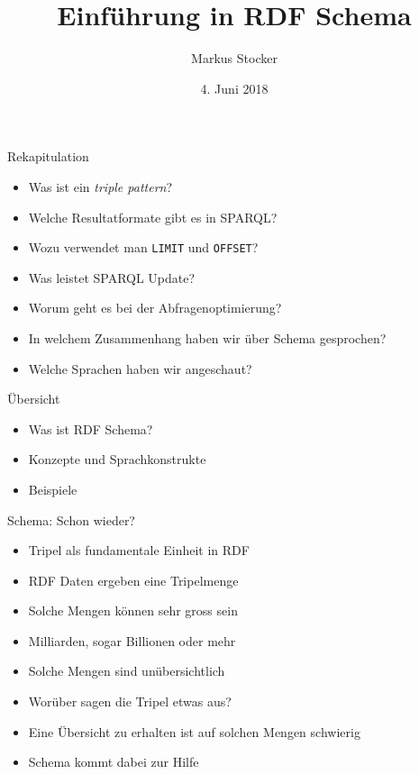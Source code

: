 \documentclass{beamer}
\title{Einführung in RDF Schema}
\author{Markus Stocker}
\date{4. Juni 2018}
\begin{document}
\maketitle

\begin{frame}{Rekapitulation}
	
	\begin{itemize}
		\item Was ist ein \emph{triple pattern}?
		\item Welche Resultatformate gibt es in SPARQL?
		\item Wozu verwendet man \texttt{LIMIT} und \texttt{OFFSET}?
		\item Was leistet SPARQL Update?
		\item Worum geht es bei der Abfragenoptimierung?
		\item In welchem Zusammenhang haben wir über Schema gesprochen?
		\item Welche Sprachen haben wir angeschaut?
	\end{itemize}
	
\end{frame}

\begin{frame}{Übersicht}
	
	\begin{itemize}
		\item Was ist RDF Schema?
		\item Konzepte und Sprachkonstrukte
		\item Beispiele
	\end{itemize}
	
\end{frame}

\begin{frame}{Schema: Schon wieder?}
	
	\begin{itemize}
		\item Tripel als fundamentale Einheit in RDF
		\item RDF Daten ergeben eine Tripelmenge
		\item Solche Mengen können sehr gross sein
		\item Milliarden, sogar Billionen oder mehr
		\item Solche Mengen sind unübersichtlich
		\item Worüber sagen die Tripel etwas aus?
		\item Eine Übersicht zu erhalten ist auf solchen Mengen schwierig
		\item Schema kommt dabei zur Hilfe
	\end{itemize}
	
\end{frame}
\end{document}
